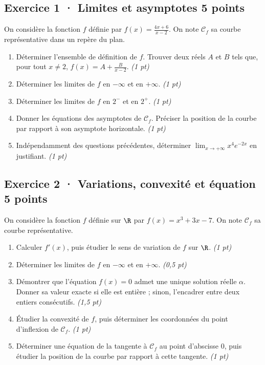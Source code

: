 \subsection*{Exercice 1 · Limites et asymptotes \hfill 5 points}On considère la fonction $f$ définie par $f(x)=\frac{4x+6}{x-2}$. On note $\mathcal C_f$ sa courbe représentative dans un repère du plan.

\begin{enumerate}

\item Déterminer l'ensemble de définition de $f$. Trouver deux réels $A$ et $B$ tels que, pour tout $x\ne2$, $f(x)=A+\frac B{x-2}$. \hfill\textit{(1 pt)}

\item Déterminer les limites de $f$ en $-\infty$ et en $+\infty$. \hfill\textit{(1 pt)}

\item Déterminer les limites de $f$ en $2^-$ et en $2^+$. \hfill\textit{(1 pt)}

\item Donner les équations des asymptotes de $\mathcal C_f$. Préciser la position de la courbe par rapport à son asymptote horizontale. \hfill\textit{(1 pt)}

\item Indépendamment des questions précédentes, déterminer $\displaystyle\lim_{x\to+\infty}x^{4}e^{-2x}$ en justifiant. \hfill\textit{(1 pt)}

\end{enumerate}

\subsection*{Exercice 2 · Variations, convexité et équation \hfill 5 points}On considère la fonction $f$ définie sur $\R$ par $f(x)=x^3+3x-7$. On note $\mathcal C_f$ sa courbe représentative.

\begin{enumerate}

\item Calculer $f' (x)$, puis étudier le sens de variation de $f$ sur $\R$. \hfill\textit{(1 pt)}

\item Déterminer les limites de $f$ en $-\infty$ et en $+\infty$. \hfill\textit{(0,5 pt)}

\item Démontrer que l'équation $f(x)=0$ admet une unique solution réelle $\alpha$. Donner sa valeur exacte si elle est entière ; sinon, l'encadrer entre deux entiers consécutifs. \hfill\textit{(1,5 pt)}

\item Étudier la convexité de $f$, puis déterminer les coordonnées du point d'inflexion de $\mathcal C_f$. \hfill\textit{(1 pt)}

\item Déterminer une équation de la tangente à $\mathcal C_f$ au point d'abscisse $0$, puis étudier la position de la courbe par rapport à cette tangente. \hfill\textit{(1 pt)}

\end{enumerate}

